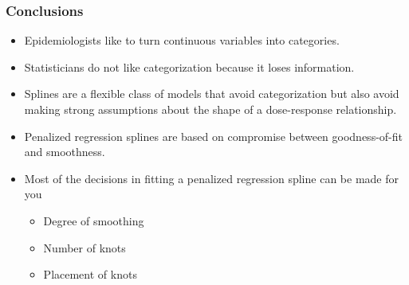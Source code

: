 \documentclass{beamer}
\begin{document}
\begin{frame}
  \frametitle{Conclusions}
  
  \begin{itemize}
  \item Epidemiologists like to turn continuous variables into categories.
  \item Statisticians do not like categorization because it loses information.
  \item Splines are a flexible class of models that avoid categorization
    but also avoid making strong assumptions about the shape of a
    dose-response relationship.
  \item Penalized regression splines are based on compromise between
    goodness-of-fit and smoothness.
  \item Most of the decisions in fitting a penalized regression spline
    can be made for you
    \begin{itemize}
    \item Degree of smoothing
    \item Number of knots
    \item Placement of knots
    \end{itemize}
  \end{itemize}
  
\end{frame}
\end{document}
